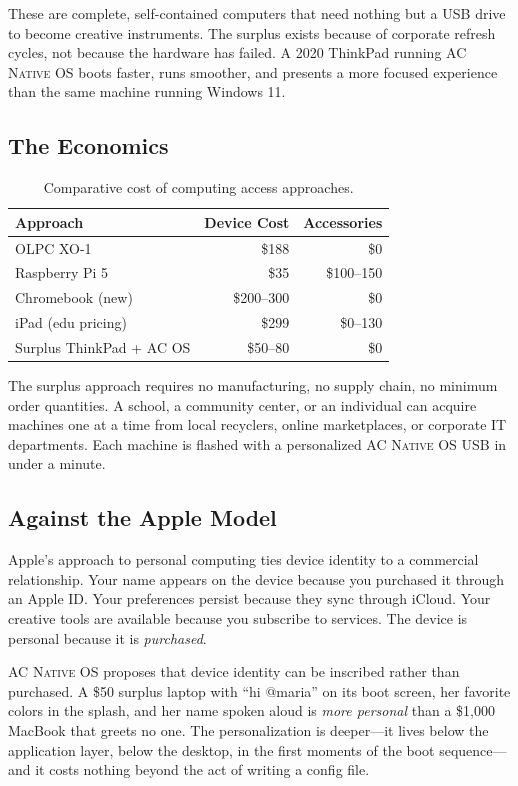 \documentclass[10pt,letterpaper,twocolumn]{article}
\newcommand{\acos}{\textsc{AC Native OS}}
\begin{document}
These are complete, self-contained computers that need nothing but a USB drive to become creative instruments. The surplus exists because of corporate refresh cycles, not because the hardware has failed. A 2020 ThinkPad running \acos{} boots faster, runs smoother, and presents a more focused experience than the same machine running Windows 11.

\subsection{The Economics}

\begin{table}[h]
\small
\centering
\begin{tabular}{lrr}
\toprule
\textbf{Approach} & \textbf{Device Cost} & \textbf{Accessories} \\
\midrule
OLPC XO-1 & \$188 & \$0 \\
Raspberry Pi 5 & \$35 & \$100--150 \\
Chromebook (new) & \$200--300 & \$0 \\
iPad (edu pricing) & \$299 & \$0--130 \\
Surplus ThinkPad + AC OS & \$50--80 & \$0 \\
\bottomrule
\end{tabular}
\caption{Comparative cost of computing access approaches.}
\label{tab:cost}
\end{table}

The surplus approach requires no manufacturing, no supply chain, no minimum order quantities. A school, a community center, or an individual can acquire machines one at a time from local recyclers, online marketplaces, or corporate IT departments. Each machine is flashed with a personalized \acos{} USB in under a minute.

\subsection{Against the Apple Model}

Apple's approach to personal computing ties device identity to a commercial relationship. Your name appears on the device because you purchased it through an Apple ID. Your preferences persist because they sync through iCloud. Your creative tools are available because you subscribe to services. The device is personal because it is \emph{purchased}.

\acos{} proposes that device identity can be inscribed rather than purchased. A \$50 surplus laptop with ``hi @maria'' on its boot screen, her favorite colors in the splash, and her name spoken aloud is \emph{more personal} than a \$1{,}000 MacBook that greets no one. The personalization is deeper---it lives below the application layer, below the desktop, in the first moments of the boot sequence---and it costs nothing beyond the act of writing a config file.
\end{document}
